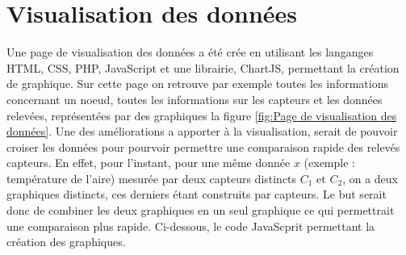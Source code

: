 \section{Visualisation des données}
Une page de visualisation des données a été crée en utilisant les langanges HTML, CSS, PHP, JavaScript et une librairie, ChartJS, permettant la création de graphique. Sur cette page on retrouve par exemple toutes les informations concernant un noeud, toutes les informations sur les capteurs  et les données relevées, représentées par des graphiques la figure \ref{fig:Page de visualisation des données}.
Une des améliorations a apporter à la visualisation, serait de pouvoir croiser les données pour pourvoir permettre une comparaison rapide des relevés capteurs. En effet, pour l'instant, pour une même donnée \begin{math}x \end{math} (exemple : température de l'aire) mesurée par deux capteurs distincts \begin{math}C_{1}\end{math} et \begin{math}C_{2}\end{math}, on a deux graphiques distincts, ces derniers étant construits par capteurs. Le but serait donc de combiner les deux graphiques en un seul graphique ce qui permettrait une comparaison plus rapide.
Ci-dessous, le code JavaScprit permettant la création des graphiques.
